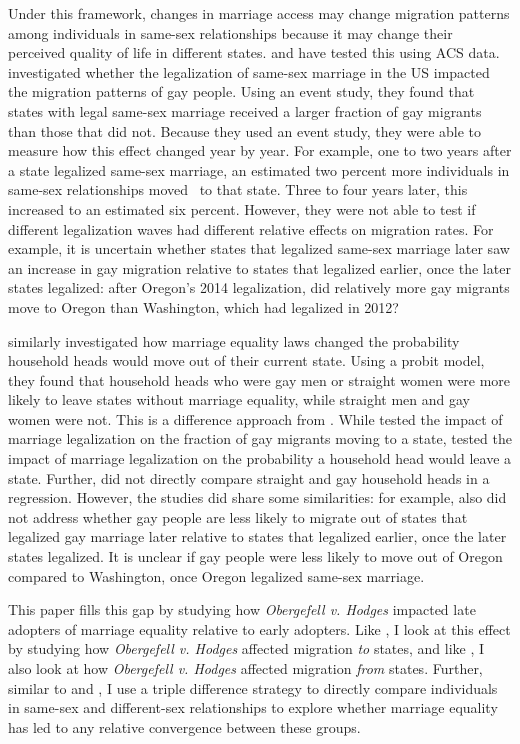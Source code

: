 \documentclass[12pt,letterpaper]{article}
\begin{document}
Under this framework, changes in marriage access may change migration patterns among individuals in same-sex relationships because it may change their perceived quality of life in different states. \citet{1} and \citet{12} have tested this using ACS data. \citet{1} investigated whether the legalization of same-sex marriage in the US impacted the migration patterns of gay people. Using an event study, they found that states with legal same-sex marriage received a larger fraction of gay migrants than those that did not. Because they used an event study, they were able to measure how this effect changed year by year. For example, one to two years after a state legalized same-sex marriage, an estimated two percent more individuals in same-sex relationships moved  to that state. Three to four years later, this increased to an estimated six percent. However, they were not able to test if different legalization waves had different relative effects on migration rates. For example, it is uncertain whether states that legalized same-sex marriage later saw an increase in gay migration relative to states that legalized earlier, once the later states legalized: after Oregon’s 2014 legalization, did relatively more gay migrants move to Oregon than Washington, which had legalized in 2012?

\citet{12} similarly investigated how marriage equality laws changed the probability household heads would move out of their current state. Using a probit model, they found that household heads who were gay men or straight women were more likely to leave states without marriage equality, while straight men and gay women were not. This is a difference approach from \citet{1}. While \citet{1} tested the impact of marriage legalization on the fraction of gay migrants moving to a state, \citet{12} tested the impact of marriage legalization on the probability a household head would leave a state. Further, \citet{12} did not directly compare straight and gay household heads in a regression. However, the studies did share some similarities: for example, \citet{12} also did not address whether gay people are less likely to migrate out of states that legalized gay marriage later relative to states that legalized earlier, once the later states legalized. It is unclear if gay people were less likely to move out of Oregon compared to Washington, once Oregon legalized same-sex marriage.

This paper fills this gap by studying how \textit{Obergefell v. Hodges} impacted late adopters of marriage equality relative to early adopters. Like \citet{1}, I look at this effect by studying how \textit{Obergefell v. Hodges} affected migration \textit{to} states, and like \citet{12}, I also look at how \textit{Obergefell v. Hodges} affected migration \textit{from} states. Further, similar to \citet{3} and \citet{30}, I use a triple difference strategy to directly compare individuals in same-sex and different-sex relationships to explore whether marriage equality has led to any relative convergence between these groups.
\end{document}
